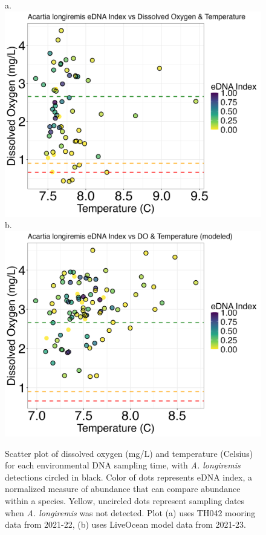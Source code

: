 \documentclass[12pt,twoside]{reedthesis}
\begin{document}
	\begin{figure}[!h]
		\begin{center}
			a. \includegraphics[scale=0.3]{Alongiremis_Scatter_noOut}
			b. \includegraphics[scale=0.3]{Alongiremis_Scatter_AllYr_mod_noOut}
			\caption[\textit{A. longiremis} scatterplot]{\footnotesize{Scatter plot of dissolved oxygen (mg/L) and temperature (Celsius) for each environmental DNA sampling time, with \textit{A. longiremis} detections circled in black. Color of dots represents eDNA index, a normalized measure of abundance that can compare abundance within a species. Yellow, uncircled dots represent sampling dates when \textit{A. longiremis} was not detected. Plot (a) uses TH042 mooring data from 2021-22, (b) uses LiveOcean model data from 2021-23.}} %
		\end{center}
		\label{AlongiremisScatter}
	\end{figure} 
	
\end{document}
